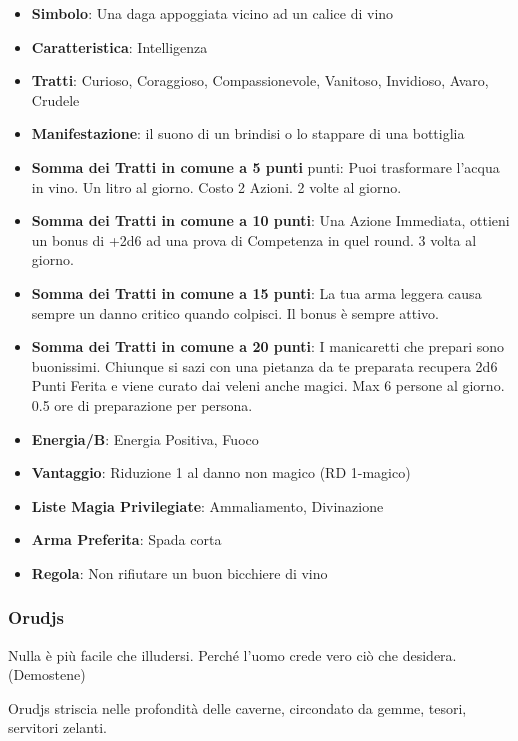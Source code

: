 \begin{multicols}{2}
\begin{itemize}[leftmargin=*] \setlength{\itemsep}{0pt}
\item \textbf{Simbolo}: Una daga appoggiata vicino ad un calice di vino
\item \textbf{Caratteristica}: Intelligenza
\item \textbf{Tratti}: Curioso, Coraggioso, Compassionevole, Vanitoso, Invidioso, Avaro, Crudele
\item \textbf{Manifestazione}: il suono di un brindisi o lo stappare di una bottiglia
\item \textbf{Somma dei Tratti in comune a 5 punti} punti: Puoi trasformare l'acqua in vino. Un litro al giorno. Costo 2 Azioni. 2 volte al giorno.
\item \textbf{Somma dei Tratti in comune a 10 punti}: Una Azione Immediata, ottieni un bonus di +2d6 ad una prova di Competenza in quel round. 3 volta al giorno.
\item \textbf{Somma dei Tratti in comune a 15 punti}: La tua arma leggera causa sempre un danno critico quando colpisci. Il bonus è sempre attivo.
\item \textbf{Somma dei Tratti in comune a 20 punti}: I manicaretti che prepari sono buonissimi. Chiunque si sazi con una pietanza da te preparata recupera 2d6 Punti Ferita e viene curato dai veleni anche magici. Max 6 persone al giorno. 0.5 ore di preparazione per persona.
\item \textbf{Energia/B}: Energia Positiva, Fuoco
\item \textbf{Vantaggio}: Riduzione 1 al danno non magico (RD 1-magico)
\item \textbf{Liste Magia Privilegiate}: Ammaliamento, Divinazione
\item \textbf{Arma Preferita}: Spada corta
\item \textbf{Regola}: Non rifiutare un buon bicchiere di vino
\end{itemize}

\subsubsection{Orudjs}\label{orudjs}\hypertarget{orudjs}{}

\begin{enfasi}{
Nulla è più facile che illudersi. Perché l'uomo crede vero ciò che desidera. (Demostene)
}\end{enfasi}

Orudjs striscia nelle profondità delle caverne, circondato da gemme, tesori, servitori zelanti.


\end{multicols}
